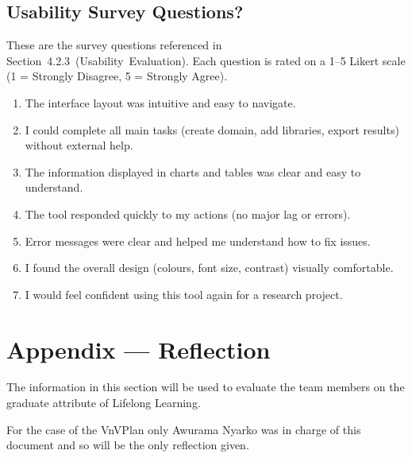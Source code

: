 \documentclass[12pt, titlepage]{article}
\begin{document}
\subsection{Usability Survey Questions?}
\label{sec:usability-survey}
These are the survey questions referenced in
Section~4.2.3~(Usability~Evaluation). Each question is rated on a 1–5
Likert scale (1 = Strongly Disagree, 5 = Strongly Agree).

\begin{enumerate}
  \item The interface layout was intuitive and easy to navigate.
  \item I could complete all main tasks (create domain, add libraries, export results) without external help.
  \item The information displayed in charts and tables was clear and easy to understand.
  \item The tool responded quickly to my actions (no major lag or errors).
  \item Error messages were clear and helped me understand how to fix issues.
  \item I found the overall design (colours, font size, contrast) visually comfortable.
  \item I would feel confident using this tool again for a research project.
\end{enumerate}

\newpage{}
\section*{Appendix --- Reflection}


The information in this section will be used to evaluate the team members on the
graduate attribute of Lifelong Learning. 

For the case of the VnVPlan only Awurama Nyarko was in charge of this document
and so will be the only reflection given.


\end{document}
